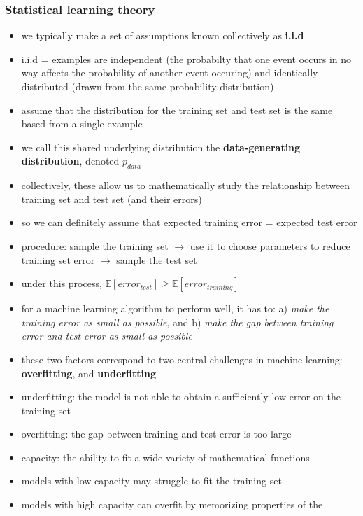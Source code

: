 \documentclass[11pt, twocolumn]{report}
\begin{document}
\subsubsection{Statistical learning theory}
\begin{itemize}
  \item we typically make a set of assumptions known collectively as
    \textbf{i.i.d}
  \item i.i.d = examples are independent (the probabilty that one event occurs
    in no way affects the probability of another event occuring) and
    identically distributed (drawn from the same probability distribution)
  \item assume that the distribution for the training set and test set is the
    same based from a single example
  \item we call this shared underlying distribution the \textbf{data-generating
      distribution}, denoted $p_{data}$
  \item collectively, these allow us to mathematically study the relationship
    between training set and test set (and their errors)
  \item so we can definitely assume that expected training error = expected
    test error
  \item procedure: sample the training set $\to$ use it to choose parameters to
    reduce training set error $\to$ sample the test set
  \item under this process, $\mathbb{E}[error_{test}] \geq
    \mathbb{E}[error_{training}]$
  \item for a machine learning algorithm to perform well, it has to: a)
    \textit{make the training error as small as possible}, and b) \textit{make
      the gap between training error and test error as small as possible}
  \item these two factors correspond to two central challenges in machine
    learning: \textbf{overfitting}, and \textbf{underfitting}
  \item underfitting: the model is not able to obtain a sufficiently low error
    on the training set
  \item overfitting: the gap between training and test error is too large
  \item capacity: the ability to fit a wide variety of mathematical functions
  \item models with low capacity may struggle to fit the training set
  \item models with high capacity can overfit by memorizing properties of the

\end{itemize}
\end{document}
